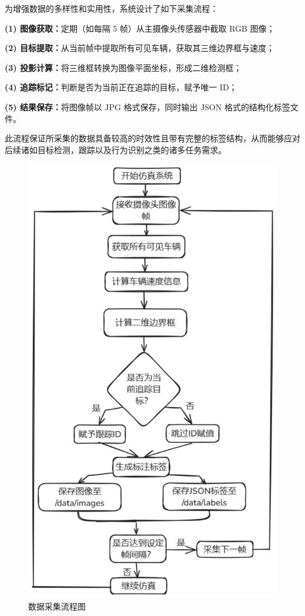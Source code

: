为增强数据的多样性和实用性，系统设计了如下采集流程：

\textbf{(1)	图像获取：}定期（如每隔 5 帧）从主摄像头传感器中截取 RGB 图像；

\textbf{(2)	目标提取：}从当前帧中提取所有可见车辆，获取其三维边界框与速度；

\textbf{(3)	投影计算：}将三维框转换为图像平面坐标，形成二维检测框；

\textbf{(4)	追踪标记：}判断是否为当前正在追踪的目标，赋予唯一 ID；

\textbf{(5)	结果保存：}将图像帧以 JPG 格式保存，同时输出 JSON 格式的结构化标签文件。

此流程保证所采集的数据具备较高的时效性且带有完整的标签结构，从而能够应对后续诸如目标检测，跟踪以及行为识别之类的诸多任务需求。

\begin{figure}[H]
	\centering
	\includegraphics[height=0.55\textheight]{images/图7 数据采集流程图.pdf}  %
	\caption{数据采集流程图}
	\label{fig:example_image}  %
\end{figure}

